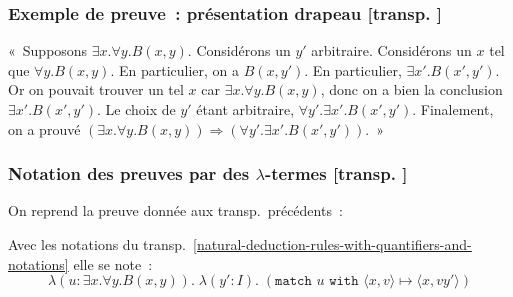 \documentclass[mathserif,a4paper,aspectratio=169]{beamer}
\renewcommand{\frametitle}[1]{\subsubsection*{#1 {\footnotesize[transp. \insertframenumber]}}}
\begin{document}
\begin{frame}
\frametitle{Exemple de preuve : présentation drapeau}

{\footnotesize
\begin{flagderiv}
\end{flagderiv}
\par}

\smallskip

{\footnotesize « Supposons $\exists x.\forall y.B(x,y)$.  Considérons
  un $y'$ arbitraire.  Considérons un $x$ tel que $\forall y.B(x,y)$.
  En particulier, on a $B(x,y')$.  En particulier, $\exists
  x'.B(x',y')$.  Or on pouvait trouver un tel $x$ car $\exists
  x.\forall y.B(x,y)$, donc on a bien la conclusion $\exists
  x'.B(x',y')$.  Le choix de $y'$ étant arbitraire, $\forall
  y'. \exists x'. B(x',y')$.  Finalement, on a prouvé $(\exists
  x.\forall y.B(x,y))\Rightarrow(\forall y'.\exists
  x'.B(x',y'))$. »\par\strut\par}

\end{frame}
%
\begin{frame}
\label{example-predicate-proof-as-lambda-term}
\frametitle{Notation des preuves par des $\lambda$-termes}

On reprend la preuve donnée aux transp. précédents :

\begin{center}
\end{center}

Avec les notations du
transp. \ref{natural-deduction-rules-with-quantifiers-and-notations}
elle se note :
\[
\lambda(u:\exists x.\forall y.B(x,y)).\;
\lambda(y':I).\;
(\texttt{match~}u\texttt{~with~}\langle x,v\rangle \mapsto
\langle x,vy'\rangle)
\]

\end{frame}
\end{document}
